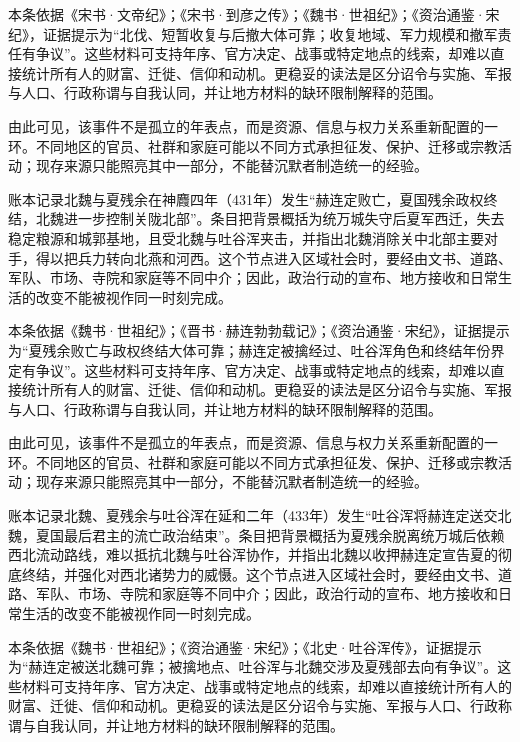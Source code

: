 本条依据《宋书·文帝纪》；《宋书·到彦之传》；《魏书·世祖纪》；《资治通鉴·宋纪》，证据提示为“北伐、短暂收复与后撤大体可靠；收复地域、军力规模和撤军责任有争议”。这些材料可支持年序、官方决定、战事或特定地点的线索，却难以直接统计所有人的财富、迁徙、信仰和动机。更稳妥的读法是区分诏令与实施、军报与人口、行政称谓与自我认同，并让地方材料的缺环限制解释的范围。

由此可见，该事件不是孤立的年表点，而是资源、信息与权力关系重新配置的一环。不同地区的官员、社群和家庭可能以不同方式承担征发、保护、迁移或宗教活动；现存来源只能照亮其中一部分，不能替沉默者制造统一的经验。

账本记录北魏与夏残余在神麚四年（431年）发生“赫连定败亡，夏国残余政权终结，北魏进一步控制关陇北部”。条目把背景概括为统万城失守后夏军西迁，失去稳定粮源和城郭基地，且受北魏与吐谷浑夹击，并指出北魏消除关中北部主要对手，得以把兵力转向北燕和河西。这个节点进入区域社会时，要经由文书、道路、军队、市场、寺院和家庭等不同中介；因此，政治行动的宣布、地方接收和日常生活的改变不能被视作同一时刻完成。

本条依据《魏书·世祖纪》；《晋书·赫连勃勃载记》；《资治通鉴·宋纪》，证据提示为“夏残余败亡与政权终结大体可靠；赫连定被擒经过、吐谷浑角色和终结年份界定有争议”。这些材料可支持年序、官方决定、战事或特定地点的线索，却难以直接统计所有人的财富、迁徙、信仰和动机。更稳妥的读法是区分诏令与实施、军报与人口、行政称谓与自我认同，并让地方材料的缺环限制解释的范围。

由此可见，该事件不是孤立的年表点，而是资源、信息与权力关系重新配置的一环。不同地区的官员、社群和家庭可能以不同方式承担征发、保护、迁移或宗教活动；现存来源只能照亮其中一部分，不能替沉默者制造统一的经验。

账本记录北魏、夏残余与吐谷浑在延和二年（433年）发生“吐谷浑将赫连定送交北魏，夏国最后君主的流亡政治结束”。条目把背景概括为夏残余脱离统万城后依赖西北流动路线，难以抵抗北魏与吐谷浑协作，并指出北魏以收押赫连定宣告夏的彻底终结，并强化对西北诸势力的威慑。这个节点进入区域社会时，要经由文书、道路、军队、市场、寺院和家庭等不同中介；因此，政治行动的宣布、地方接收和日常生活的改变不能被视作同一时刻完成。

本条依据《魏书·世祖纪》；《资治通鉴·宋纪》；《北史·吐谷浑传》，证据提示为“赫连定被送北魏可靠；被擒地点、吐谷浑与北魏交涉及夏残部去向有争议”。这些材料可支持年序、官方决定、战事或特定地点的线索，却难以直接统计所有人的财富、迁徙、信仰和动机。更稳妥的读法是区分诏令与实施、军报与人口、行政称谓与自我认同，并让地方材料的缺环限制解释的范围。

